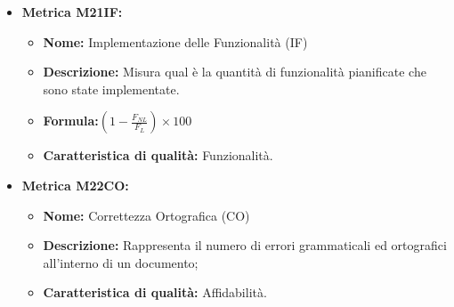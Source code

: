 \begin{itemize}
    \item \textbf{Metrica M21IF:}
                  \begin{itemize}
                      \item \textbf{Nome:} Implementazione delle Funzionalità (IF)
                      \item \textbf{Descrizione:} Misura qual è la quantità di funzionalità pianificate che sono state implementate.
                      \item \textbf{Formula:}$(1 - \frac{F_{NL}}{F_L}) \times 100$
                      \item \textbf{Caratteristica di qualità:} Funzionalità.
                  \end{itemize}

    \item \textbf{Metrica M22CO:}
          \begin{itemize}
              \item \textbf{Nome:} Correttezza Ortografica (CO)
              \item \textbf{Descrizione:} Rappresenta il numero di errori grammaticali ed
              ortografici all'interno di un documento;
              \item \textbf{Caratteristica di qualità:} Affidabilità.
          \end{itemize}


\end{itemize}
